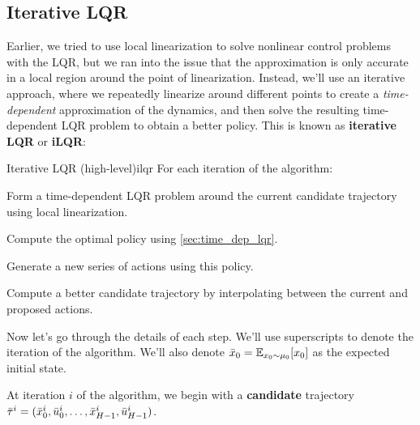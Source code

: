 \documentclass[\main/main]{subfiles}
\begin{document}
\subsection{Iterative LQR}

Earlier, we tried to use local linearization to solve nonlinear control problems with the LQR, but we ran into the issue that the approximation is only accurate in a local region around the point of linearization.
Instead, we'll use an iterative approach, where we repeatedly linearize around different points to create a \emph{time-dependent} approximation of the dynamics, and then solve the resulting time-dependent LQR problem to obtain a better policy.
This is known as \textbf{iterative LQR} or \textbf{iLQR}:

\begin{definition}{Iterative LQR (high-level)}{ilqr}
    For each iteration of the algorithm:
    \begin{steps}
        \item Form a time-dependent LQR problem around the current candidate trajectory using local linearization.
        \item Compute the optimal policy using \autoref{sec:time_dep_lqr}.
        \item Generate a new series of actions using this policy.
        \item Compute a better candidate trajectory by interpolating between the current and proposed actions.
    \end{steps}
\end{definition}

Now let's go through the details of each step. We'll use superscripts to denote the iteration of the algorithm. We'll also denote $\bar {x}_0 = \operatorname*{\mathbb{E}}_{x_0 \sim \mu_0} [x_0]$ as the expected initial state.

At iteration $i$ of the algorithm, we begin with a \textbf{candidate} trajectory $\bar \tau^i = (\bar {x}^i_0, \bar {u}^i_0, \dots, \bar {x}^i_{H-1}, \bar {u}^i_{H-1})$.
\end{document}
